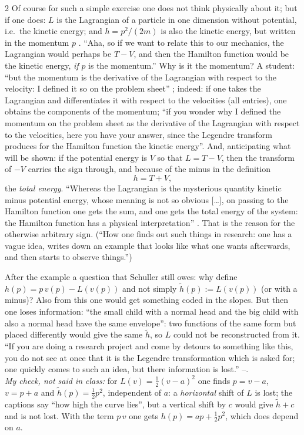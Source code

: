\begin{paracol}{2}
Of course for such a simple exercise one does not think physically about it; but if one does: $L$ is the Lagrangian of a particle in one dimension without potential, i.e.\ the kinetic energy; and $h=p^2/(2m)$ is also the kinetic energy, but written in the momentum $p$ . ``Aha, so if we want to relate this to our mechanics, the Lagrangian would perhaps be $T-V$, and then the Hamilton function would be the kinetic energy, \emph{if} $p$ is the momentum.'' Why is it the momentum? A student: ``but the momentum is the derivative of the Lagrangian with respect to the velocity: I defined it so on the problem sheet'' ; indeed: if one takes the Lagrangian and differentiates it with respect to the velocities (all entries), one obtains the components of the momentum; ``if you wonder why I defined the momentum on the problem sheet as the derivative of the Lagrangian with respect to the velocities, here you have your answer, since the Legendre transform produces for the Hamilton function the kinetic energy''. And, anticipating what will be shown: if the potential energy is $V$ so that $L=T-V$, then the transform of $-V$ carries the sign through, and because of the minus in the definition \[h=T+V,\] the \emph{total energy}. ``Whereas the Lagrangian is the mysterious quantity kinetic minus potential energy, whose meaning is not so obvious [\dots], on passing to the Hamilton function one gets the sum, and one gets the total energy of the system: the Hamilton function has a physical interpretation'' . That is the reason for the otherwise arbitrary sign. (``How one finds out such things in research: one has a vague idea, writes down an example that looks like what one wants afterwards, and then starts to observe things.'') 

\begin{secondary}
After the example a question that Schuller still owes: why define $h(p)=p\,v(p)-L(v(p))$ and not simply $\tilde h(p):=L(v(p))$ (or with a minus)? Also from this one would get something coded in the slopes. But then one loses information: ``the small child with a normal head and the big child with also a normal head have the same envelope'': two functions of the same form but placed differently would give the same $\tilde h$, so $L$ could not be reconstructed from it. ``If you are doing a research project and come by detours to something like this, you do not see at once that it is the Legendre transformation which is asked for; one quickly comes to such an idea, but there information is lost.'' --.\\
\emph{My check, not said in class:} for $L(v)=\tfrac12(v-a)^2$ one finds $p=v-a$, $v=p+a$ and $\tilde h(p)=\tfrac12p^2$, independent of $a$: a \emph{horizontal} shift of $L$ is lost; the captions say ``how high the curve lies'', but a vertical shift by $c$ would give $\tilde h+c$ and is not lost. With the term $p\,v$ one gets $h(p)=ap+\tfrac12p^2$, which does depend on $a$.
\end{secondary}


\end{paracol}
